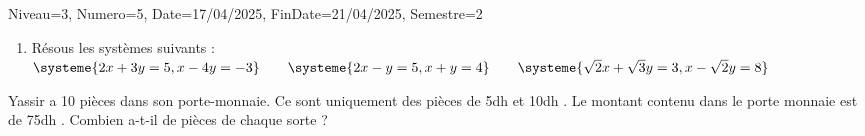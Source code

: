 \documentclass[a4paper,12pt]{article}
\begin{document}
\begin{Maquette}[DM]{Niveau=3, Numero=5, Date=17/04/2025, FinDate=21/04/2025, Semestre=2}
\begin{exercice}
\begin{enumerate}
\item Résous les systèmes suivants :
\(
\systeme{2x+3y=5,x-4y=-3}      
\qquad
\systeme{2x-y=5,x+y=4}
\qquad
\systeme{\sqrt{2}x+\sqrt{3}y=3,x-\sqrt{2}y=8}
\)
\end{enumerate}
\end{exercice}
\begin{exercice}
Yassir a 10 pièces dans son porte-monnaie. Ce sont uniquement des pièces de 5dh et 10dh . Le montant contenu dans le porte monnaie est de 75dh . Combien a-t-il de pièces de chaque sorte ?
\end{exercice}
%

\end{Maquette}
\end{document}
